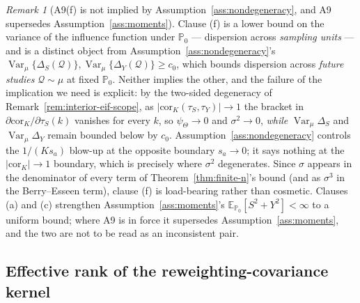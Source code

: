 \documentclass[11pt]{article}
\theoremstyle{plain}
\theoremstyle{definition}
\theoremstyle{remark}
\newtheorem{remark}[theorem]{Remark}
\newcommand{\E}{\mathbb{E}}
\newcommand{\PP}{\mathbb{P}}
\newcommand{\Q}{\mathcal{Q}}
\newcommand{\Corr}{\mathrm{cor}}
\DeclareMathOperator{\Var}{Var}
\begin{document}
\begin{remark}[A9(f) is not implied by Assumption~\ref{ass:nondegeneracy}, and A9
supersedes Assumption~\ref{ass:moments}]\label{rem:a9-independence}
Clause (f) is a lower bound on the variance of the influence function under $\PP_0$ ---
dispersion across \emph{sampling units} --- and is a distinct object from
Assumption~\ref{ass:nondegeneracy}'s $\Var_\mu\{\Delta_S(\Q)\},\Var_\mu\{\Delta_Y(\Q)\}\ge c_0$,
which bounds dispersion across \emph{future studies} $\Q\sim\mu$ at fixed $\PP_0$.
Neither implies the other, and the failure of the implication we need is explicit: by the
two-sided degeneracy of Remark~\ref{rem:interior-eif-scope}, as
$|\Corr_K(\tau_S,\tau_Y)|\to1$ the bracket in $\partial\Corr_K/\partial\tau_S(k)$
vanishes for every $k$, so $\psi_\Theta\to0$ and $\sigma^2\to0$, \emph{while}
$\Var_\mu\Delta_S$ and $\Var_\mu\Delta_Y$ remain bounded below by $c_0$.
Assumption~\ref{ass:nondegeneracy} controls the $1/(Ks_a)$ blow-up at the opposite
boundary $s_a\to0$; it says nothing at the $|\Corr_K|\to1$ boundary, which is precisely
where $\sigma^2$ degenerates. Since $\sigma$ appears in the denominator of every term of
Theorem~\ref{thm:finite-n}'s bound (and as $\sigma^3$ in the Berry--Esseen term),
clause (f) is load-bearing rather than cosmetic. Clauses (a) and (c) strengthen
Assumption~\ref{ass:moments}'s $\E_{\PP_0}[S^2+Y^2]<\infty$ to a uniform bound; where A9
is in force it supersedes Assumption~\ref{ass:moments}, and the two are not to be read
as an inconsistent pair.
\end{remark}

\subsection{Effective rank of the reweighting-covariance kernel}\label{sec:rank}
\end{document}
